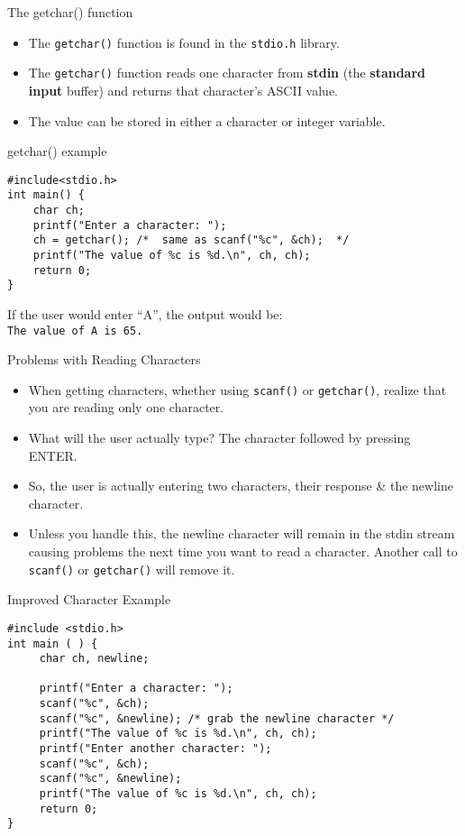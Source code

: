 \documentclass[graphics]{beamer}
\begin{document}
\begin{frame}{The getchar() function}
    \begin{itemize}
        \item The \texttt{getchar()} function is found in the \texttt{stdio.h} library.
        \item The \texttt{getchar()} function reads one character from \textbf{stdin} (the \textbf{standard input} buffer) and returns that character's ASCII value.
        \item The value can be stored in either a character or integer variable.
    \end{itemize}
\end{frame}

\begin{frame}[fragile]{getchar() example}
    \begin{verbatim}
#include<stdio.h>
int main() {
    char ch;
    printf("Enter a character: ");
    ch = getchar(); /*  same as scanf("%c", &ch);  */
    printf("The value of %c is %d.\n", ch, ch);
    return 0;
}
    \end{verbatim}
    If the user would enter ``A'', the output would be: \\
    \texttt{The value of A is 65.}
\end{frame}

\begin{frame}{Problems with Reading Characters}
    \begin{itemize}
        \item When getting characters, whether using \texttt{scanf()} or \texttt{getchar()}, realize that you are reading only one character.
        \item What will the user actually type? The character followed by pressing ENTER.
        \item So, the user is actually entering two characters, their response \& the newline character.
        \item Unless you handle this, the newline character will remain in the stdin stream causing problems the next time you want to read a character.  Another call to \texttt{scanf()} or \texttt{getchar()} will remove it.
    \end{itemize}
\end{frame}

\begin{frame}[fragile]{Improved Character Example}
    \begin{verbatim}
#include <stdio.h>
int main ( ) {
     char ch, newline;

     printf("Enter a character: ");
     scanf("%c", &ch);
     scanf("%c", &newline); /* grab the newline character */
     printf("The value of %c is %d.\n", ch, ch);
     printf("Enter another character: ");
     scanf("%c", &ch);
     scanf("%c", &newline); 
     printf("The value of %c is %d.\n", ch, ch);
     return 0;
}
    \end{verbatim}
\end{frame}
\end{document}
